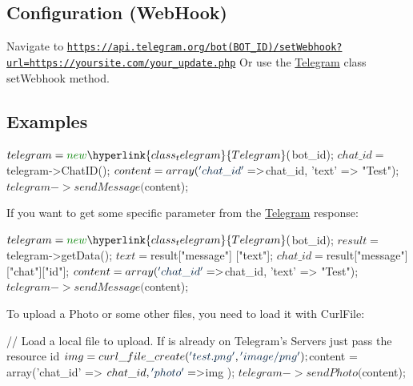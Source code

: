 \subsection*{Configuration (Web\+Hook) }

Navigate to \href{https://api.telegram.org/bot(BOT_ID)/setWebhook?url=https://yoursite.com/your_update.php}{\tt https\+://api.\+telegram.\+org/bot(\+B\+O\+T\+\_\+\+I\+D)/set\+Webhook?url=https\+://yoursite.\+com/your\+\_\+update.\+php} Or use the \hyperlink{class_telegram}{Telegram} class set\+Webhook method.

\subsection*{Examples }


\begin{DoxyCode}
$telegram = \textcolor{keyword}{new} \hyperlink{class_telegram}{Telegram}($bot\_id);
$chat\_id = $telegram->ChatID();
$content = array(\textcolor{stringliteral}{'chat\_id'} => $chat\_id, \textcolor{stringliteral}{'text'} => \textcolor{stringliteral}{"Test"});
$telegram->sendMessage($content);
\end{DoxyCode}


If you want to get some specific parameter from the \hyperlink{class_telegram}{Telegram} response\+: 
\begin{DoxyCode}
$telegram = \textcolor{keyword}{new} \hyperlink{class_telegram}{Telegram}($bot\_id);
$result = $telegram->getData();
$text = $result[\textcolor{stringliteral}{"message"}] [\textcolor{stringliteral}{"text"}];
$chat\_id = $result[\textcolor{stringliteral}{"message"}] [\textcolor{stringliteral}{"chat"}][\textcolor{stringliteral}{"id"}];
$content = array(\textcolor{stringliteral}{'chat\_id'} => $chat\_id, \textcolor{stringliteral}{'text'} => \textcolor{stringliteral}{"Test"});
$telegram->sendMessage($content);
\end{DoxyCode}


To upload a Photo or some other files, you need to load it with Curl\+File\+: 
\begin{DoxyCode}
\textcolor{comment}{// Load a local file to upload. If is already on Telegram's Servers just pass the resource id}
$img = curl\_file\_create(\textcolor{stringliteral}{'test.png'},\textcolor{stringliteral}{'image/png'}); 
$content = array(\textcolor{stringliteral}{'chat\_id'} => $chat\_id, \textcolor{stringliteral}{'photo'} => $img );
$telegram->sendPhoto($content);
\end{DoxyCode}


